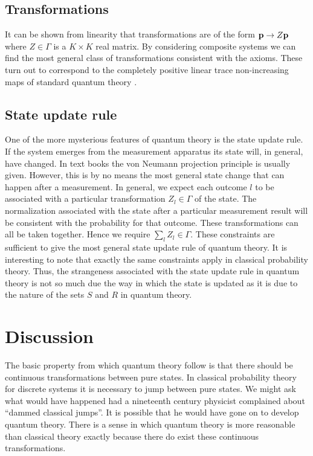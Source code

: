 \documentclass[10pt]{article}
\begin{document}
\subsection{Transformations}

It can be shown from linearity that transformations are of the form
${\bf p}\rightarrow Z{\bf p}$ where $Z\in\Gamma$ is a $K\times K$ real
matrix.
By considering composite systems we can find the most general class of
transformations consistent with the axioms.  These turn out to
correspond to the completely positive linear trace non-increasing maps
of standard quantum theory \cite{krauss,nielsenchuang}.

\subsection{State update rule}

One of the more mysterious features of quantum theory is the state update
rule. If the system emerges from the measurement apparatus its state
will, in general, have changed.  In text books the von Neumann
projection principle is usually given. However, this is by no means the
most general state change that can happen after a measurement.  In
general, we expect each outcome $l$ to be associated with a particular
transformation $Z_l\in\Gamma$ of the state. The normalization associated
with the state after a particular measurement result will be consistent
with the probability for that outcome. These transformations can all be
taken together. Hence we require $\sum_l Z_l \in \Gamma$.  These
constraints are sufficient to give the most general state update rule of
quantum theory.  It is  interesting to note that exactly the same
constraints apply in
classical probability theory.  Thus, the strangeness associated with the
state update rule in quantum theory is not so much due the way in which
the state is updated as it is due to the nature of the sets $S$ and $R$
in quantum theory.

\section{Discussion}

The basic property from which quantum theory follow is that there should
be continuous transformations between pure states.  In classical
probability theory for discrete systems it is necessary to
jump between pure states.  We
might ask what would have happened had a nineteenth century physicist
complained about ``dammed classical jumps''.  It is possible that he
would have gone on to develop quantum theory.  There is a sense in
which quantum theory is more reasonable than classical theory exactly
because there do exist these continuous transformations.
\end{document}
